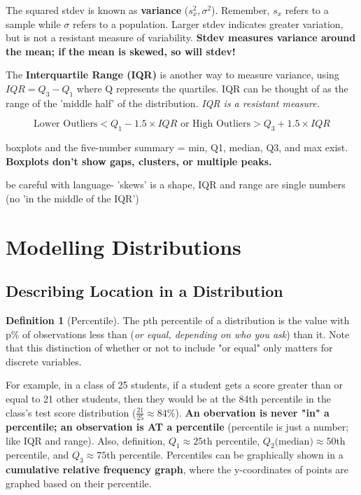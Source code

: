\documentclass[12pt, a4paper]{article}
\theoremstyle{definition}
\newtheorem{definition}{Definition}
\begin{document}
The squared stdev is known as \textbf{variance} ($s_x^2, \sigma^2$). Remember, $s_x$ refers to a sample while $\sigma$ refers to a population. Larger stdev indicates greater variation, but is not a resistant measure of variability. \textbf{Stdev measures variance around the mean; if the mean is skewed, so will stdev!}

The \textbf{Interquartile Range (IQR)} is another way to measure variance, using $IQR = Q_3 - Q_1$ where Q represents the quartiles. IQR can be thought of as the range of the 'middle half' of the distribution. \textit{IQR is a resistant measure.}

\[\textrm{Lower Outliers} < Q_1 - 1.5 \times IQR \textrm{ or High Outliers} > Q_3 + 1.5 \times IQR\]

boxplots and the five-number summary = min, Q1, median, Q3, and max exist. \textbf{Boxplots don't show gaps, clusters, or multiple peaks.}

be careful with language- 'skews' is a shape, IQR and range are single numbers (no 'in the middle of the IQR')

\newpage

\section{Modelling Distributions}
\subsection{Describing Location in a Distribution}
\begin{definition}[Percentile]
    The pth percentile of a distribution is the value with p\% of observations less than (\textit{or equal, depending on who you ask}) than it. Note that this distinction of whether or not to include "or equal" only matters for discrete variables.
\end{definition}

For example, in a class of 25 students, if a student gets a score greater than or equal to 21 other students, then they would be at the 84th percentile in the class's test score distribution ($\frac{21}{25} \approx 84\%$).
\textbf{An obervation is never "in" a percentile; an observation is AT a percentile} (percentile is just a number; like IQR and range). Also, definition, $Q_1 \approx 25$th percentile, $Q_2 \textrm{(median)} \approx 50$th percentile, and $Q_3 \approx 75$th percentile.
Percentiles can be graphically shown in a \textbf{cumulative relative frequency graph}, where the y-coordinates of points are graphed based on their percentile.
\end{document}
